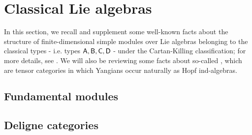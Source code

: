 \section{Classical Lie algebras}
    In this section, we recall and supplement some well-known facts about the structure of finite-dimensional simple modules over Lie algebras belonging to the classical types - i.e. types $\mathsf{A}, \mathsf{B}, \mathsf{C}, \mathsf{D}$ - under the Cartan-Killing classification; for more details, see \cite{carter_affine_lie_algebras}. We will also be reviewing some facts about so-called , which are tensor categories in which Yangians occur naturally as Hopf ind-algebras.

    \subsection{Fundamental modules}

    \subsection{Deligne categories}